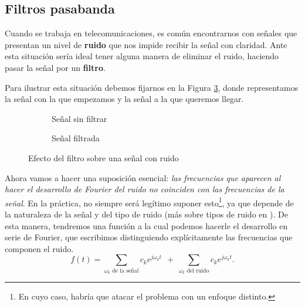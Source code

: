 \subsection{Filtros pasabanda}
Cuando se trabaja en telecomunicaciones, es común encontrarnos con señales que presentan un nivel de \textbf{ruido} que nos impide recibir la señal con claridad. Ante esta situación sería ideal tener alguna manera de eliminar el ruido, haciendo pasar la señal por un \textbf{filtro}.

Para ilustrar esta situación debemos fijarnos en la Figura \ref{fig:EfectoFiltro}, donde representamos la señal con la que empezamos y la señal a la que queremos llegar.


\begin{figure}[h]
\begin{figurebox}
    \vspace{10pt}
    \centering
      \begin{subfigure}{.45\textwidth}
          \centering
          \scalebox{0.30}{ }
          \caption{Señal sin filtrar}
          \label{fig:0a} 
      \end{subfigure}%
      \begin{subfigure}{.45\textwidth}
          \centering
          \scalebox{0.30}{}
          \caption{Señal filtrada}
          \label{fig:0b}
      \end{subfigure}
      \caption{Efecto del filtro sobre una señal con ruido}
      \label{fig:EfectoFiltro}
    
\end{figurebox}
\end{figure}

Ahora vamos a hacer una suposición esencial: \textit{las frecuencias que aparecen al hacer el desarrollo de Fourier del ruido no coinciden con las frecuencias de la señal}. En la práctica, no siempre será legítimo suponer esto\footnote{ En cuyo caso, habría que atacar el problema con un enfoque distinto.}, ya que depende de la naturaleza de la señal y del tipo de ruido (más sobre tipos de ruido en \cite{ColorNoise}). De esta manera, tendremos una función a la cual podemos hacerle el desarrollo en serie de Fourier, que escribimos distinguiendo explícitamente las frecuencias que componen el ruido.
\begin{equation}
  \label{eq:FourierSignalRuido1}
  f(t) = \sum_{\omega_k\text{ de la señal}}\!\!\!\!\!\!\!c_k e^{j\omega_k t}\ \ +\  \sum_{\omega_k\text{ del ruido}}\!\!\!\!\!c_k e^{j\omega_k t}.
\end{equation}

